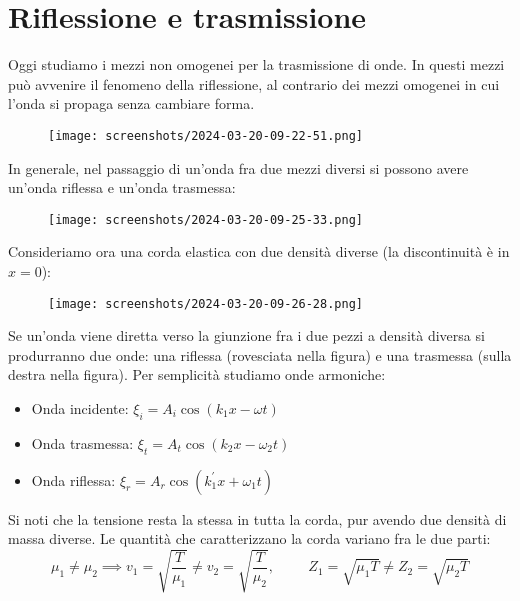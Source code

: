 \section{Riflessione e trasmissione}

Oggi studiamo i mezzi non omogenei per la trasmissione di onde. In questi mezzi può avvenire il fenomeno della riflessione, al contrario dei mezzi omogenei in cui l'onda si propaga senza cambiare forma.

\begin{figure}[H]
	\centering
	\texttt{[image: screenshots/2024-03-20-09-22-51.png]}
\end{figure}

In generale, nel passaggio di un'onda fra due mezzi diversi si possono avere un'onda riflessa e un'onda trasmessa:

\begin{figure}[H]
	\centering
	\texttt{[image: screenshots/2024-03-20-09-25-33.png]}
\end{figure}

Consideriamo ora una corda elastica con due densità diverse (la discontinuità è in \(x=0\)):

\begin{figure}[H]
	\centering
	\texttt{[image: screenshots/2024-03-20-09-26-28.png]}
\end{figure}
Se un'onda viene diretta verso la giunzione fra i due pezzi a densità diversa si produrranno due onde: una riflessa (rovesciata nella figura) e una trasmessa (sulla destra nella figura). Per semplicità studiamo onde armoniche:

\begin{itemize}
	\item Onda incidente: \(\xi _i = A_i \cos (k_1 x -\omega t)\) 	
	\item Onda trasmessa: \(\xi _t = A_t \cos (k_2 x - \omega _2 t)\) 
	\item Onda riflessa: \(\xi _r = A_r \cos (k_1^{\prime} x + \omega _1 t)\) 
\end{itemize}

Si noti che la tensione resta la stessa in tutta la corda, pur avendo due densità di massa diverse. Le quantità che caratterizzano la corda variano fra le due parti:
\[
	\mu _1 \neq \mu _2 \implies v_1 = \sqrt{\frac{T}{\mu _1}} \neq v_2 = \sqrt{\frac{T}{\mu _2}},\hspace{1cm} Z_1=\sqrt{\mu _1 T}\neq Z_2 = \sqrt{\mu _2 T}   
\]

